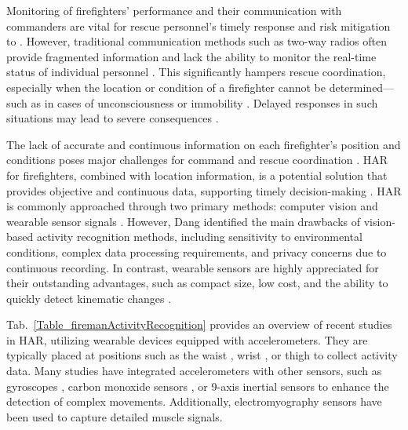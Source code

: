 \documentclass[journal,twoside,web]{ieeecolor}
\begin{document}
 
Monitoring of firefighters' performance and their communication with commanders are vital for rescue personnel's timely response and risk mitigation to  \cite{Firefighter_limited2019,FirefighterImportant2022}. However, traditional communication methods such as two-way radios often provide fragmented information and lack the ability to monitor the real-time status of individual personnel \cite{Clifford2021}. This significantly hampers rescue coordination, especially when the location or condition of a firefighter cannot be determined—such as in cases of unconsciousness or immobility \cite{Zhang2024}. Delayed responses in such situations may lead to severe consequences \cite{carmona2024firefighters, Waring2024, Tamrakar2020}.

The lack of accurate and continuous information on each firefighter’s position and conditions poses major challenges for command and rescue coordination \cite{RF_ForestFires2024,Firefighter_Falling_2023,Firefighterhealthcare2024}. HAR for firefighters, combined with location information, is a potential solution that provides objective and continuous data, supporting timely decision-making \cite{Accelerometerlocation2021}. HAR is commonly approached through two primary methods: computer vision \cite{HARvision2020} and wearable sensor signals \cite{HongNhung2023}. However, Dang \cite{HARvision2020} identified the main drawbacks of vision-based activity recognition methods, including sensitivity to environmental conditions, complex data processing requirements, and privacy concerns due to continuous recording. In contrast, wearable sensors are highly appreciated for their outstanding advantages, such as compact size, low cost, and the ability to quickly detect kinematic changes \cite{Accelerometer2021,DaoHieu2022,ViManhTuyen2024,HongNhung2023,Thu2022,AccelerometerHAR2023,accelerometer_error2024,Thanhfire2019,Chai2021,CHAI_FIRE2024}. 

Tab.~\ref{Table_firemanActivityRecognition} provides an overview of recent studies in HAR, utilizing wearable devices equipped with accelerometers. They are typically placed at positions such as the waist \cite{Thu2022,Elder_Falling_2019}, wrist \cite{Lu2020}, or thigh \cite{Thanhfire2019} to collect activity data. Many studies have integrated accelerometers with other sensors, such as gyroscopes \cite{DaoHieu2022}, carbon monoxide sensors \cite{Dang2022}, or 9-axis inertial sensors \cite{Chai2021} to enhance the detection of complex movements. Additionally, electromyography sensors \cite{CHAI_FIRE2024} have been used to capture detailed muscle signals.
\end{document}

